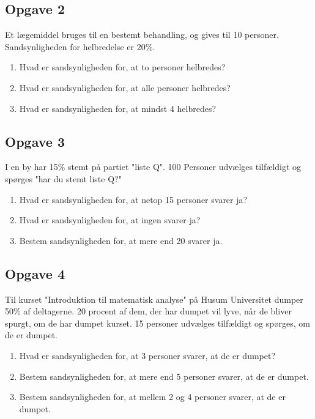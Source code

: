 \subsection*{Opgave 2}
Et lægemiddel bruges til en bestemt behandling, og gives til 10 personer. Sandsynligheden for helbredelse er 20$\%$. 
\begin{enumerate}[label=\roman*)]
	\item Hvad er sandsynligheden for, at to personer helbredes?
	\item Hvad er sandsynligheden for, at alle personer helbredes?
	\item Hvad er sandsynligheden for, at mindst 4 helbredes? 
\end{enumerate}

\subsection*{Opgave 3}
I en by har 15$\%$ stemt på partiet "liste Q". 100 Personer udvælges tilfældigt og spørges "har du stemt liste Q?"
\begin{enumerate}[label=\roman*)]
	\item Hvad er sandsynligheden for, at netop 15 personer svarer ja?
	\item Hvad er sandsynligheden for, at ingen svarer ja?
	\item Bestem sandsynligheden for, at mere end 20 svarer ja. 
\end{enumerate}

\subsection*{Opgave 4}
Til kurset "Introduktion til matematisk analyse" på Husum Universitet dumper 50$\%$ af deltagerne. 20 procent af dem, der har dumpet vil lyve, når de bliver spurgt, om de har dumpet kurset. 15 personer udvælges tilfældigt og spørges, om de er dumpet. 
\begin{enumerate}[label=\roman*)]
	\item Hvad er sandsynligheden for, at 3 personer svarer, at de er dumpet?
	\item Bestem sandsynligheden for, at mere end 5 personer svarer, at de er dumpet.
	\item Bestem sandsynligheden for, at mellem 2 og 4 personer svarer, at de er dumpet. 
\end{enumerate}